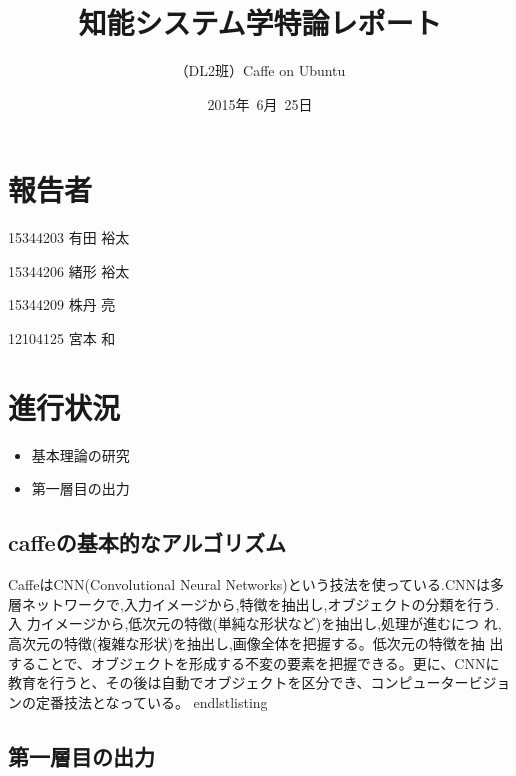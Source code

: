 \documentclass[a4paper,10pt]{jsarticle}
\title{知能システム学特論レポート}
\author{
（DL2班）Caffe on Ubuntu\\
}
\date{2015年\ 6月\ 25日}
\begin{document}
\maketitle
\section{報告者}
\begin{list}{}{}
 \item 15344203\hspace{0.5cm} 有田 裕太
 \item 15344206\hspace{0.5cm} 緒形 裕太
 \item 15344209\hspace{0.5cm} 株丹 亮
 \item 12104125\hspace{0.5cm} 宮本 和
\end{list}

\section{進行状況}
\begin{itemize}
\item 基本理論の研究
\item 第一層目の出力
\end{itemize}
\subsection{caffeの基本的なアルゴリズム}
CaffeはCNN(Convolutional Neural Networks)という技法を使っている.CNNは多
層ネットワークで,入力イメージから,特徴を抽出し,オブジェクトの分類を行う.入
力イメージから,低次元の特徴(単純な形状など)を抽出し,処理が進むにつ
れ,高次元の特徴(複雑な形状)を抽出し,画像全体を把握する。低次元の特徴を抽
出することで、オブジェクトを形成する不変の要素を把握できる。更に、CNNに教育を行うと、その後は自動でオブジェクトを区分でき、コンピュータービジョンの定番技法となっている。
end{lstlisting}

\subsection{第一層目の出力}

\begin{lstlisting}[basicstyle=\ttfamily\footnotesize, frame=single]

\end{lstlisting}
\end{document}
